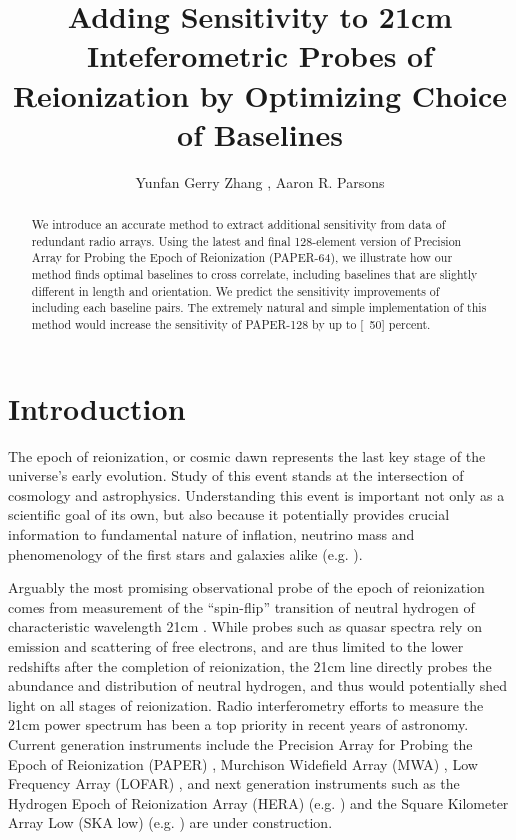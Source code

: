 \documentclass[preprint2,numberedappendix,tighten,twocolappendix]{aastex6}  %
\renewcommand\[{\begin{equation}}
\renewcommand\]{\end{equation}}
\begin{document}
\title{Adding Sensitivity to 21cm Inteferometric Probes of Reionization by Optimizing Choice of Baselines}

\author{
Yunfan Gerry Zhang ,
Aaron R. Parsons
}


\begin{abstract}
We introduce an accurate method to extract additional sensitivity from data of redundant radio arrays. 
Using the latest and final 128-element version of Precision Array for Probing the Epoch of Reionization (PAPER-64), we illustrate 
how our method finds optimal baselines to cross correlate, including baselines that are slightly different in length and orientation. 
We predict the sensitivity improvements of including each baseline pairs. The extremely natural and simple implementation of this method
would increase the sensitivity of PAPER-128 by up to [~50] percent. 
\end{abstract}

\section{Introduction}

The epoch of reionization, or cosmic dawn represents the last key
stage of the universe's early evolution. Study of this event stands at
the intersection of cosmology and astrophysics. Understanding this
event is important not only as a scientific goal
of its own, but also because it potentially provides crucial information
to fundamental nature of inflation, neutrino mass and phenomenology
of the first stars and galaxies alike (e.g. \cite{LiuOpticalDepth}). 

Arguably the most promising observational probe of the epoch of reionization
comes from measurement of the ``spin-flip'' transition of neutral
hydrogen of characteristic wavelength 21cm \cite{Furlanetto2006181,PritchardLoeb}.
While probes such as quasar spectra rely on emission and scattering
of free electrons, and are thus limited to the lower redshifts after
the completion of reionization, the 21cm line directly probes the
abundance and distribution of neutral hydrogen, and thus would potentially
shed light on all stages of reionization. Radio interferometry efforts
to measure the 21cm power spectrum has been a top priority in recent years of astronomy.
Current generation instruments include the Precision Array for Probing
the Epoch of Reionization (PAPER) \cite{Ali2015,paper32}, Murchison
Widefield Array (MWA) \cite{MWA}, Low Frequency Array (LOFAR) \cite{LOFAR},
and next generation instruments such as the Hydrogen Epoch of Reionization
Array (HERA) (e.g. \cite{HERA,HERAconfiguration,HERABEAM1,HERADISH2})
and the Square Kilometer Array Low (SKA low) (e.g. \cite{SKA1}) are
under construction. 
\end{document}
